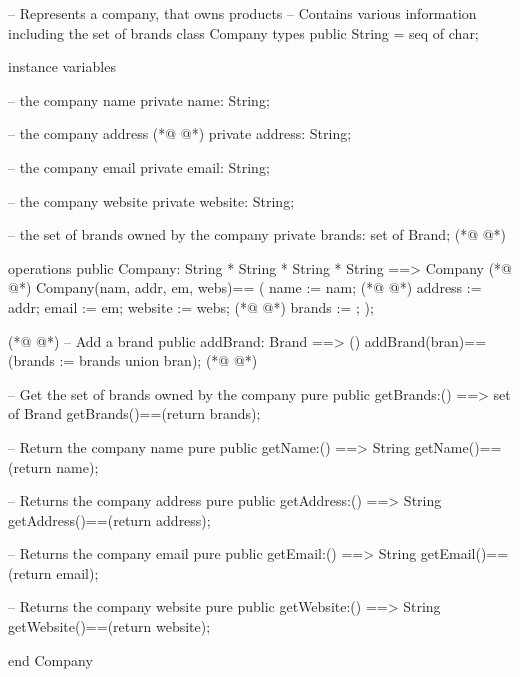 \begin{vdmpp}[breaklines=true]
-- Represents a company, that owns products
-- Contains various information including the set of brands
class Company
 types
  public String = seq of char;
 
 instance variables
 
   -- the company name
  private name: String;
  
  -- the company address
(*@
\label{Company:13}
@*)
  private address: String;
  
  -- the company email
  private email: String;
  
  -- the company website
  private website: String;
  
  -- the set of brands owned by the company
  private brands: set of Brand;
(*@
\label{addBrand:23}
@*)
  
 operations
  public Company: String * String * String * String ==> Company 
(*@
\label{getBrands:26}
@*)
  Company(nam, addr, em, webs)==
  (
   name := nam;
(*@
\label{getName:29}
@*)
   address := addr;
   email := em;
   website := webs;
(*@
\label{getAddress:32}
@*)
   brands := {};
  );
  
(*@
\label{getEmail:35}
@*)
  -- Add a brand
  public addBrand: Brand ==> ()
  addBrand(bran)==(brands := brands union {bran});
(*@
\label{getWebsite:38}
@*)
  
  -- Get the set of brands owned by the company
  pure public getBrands:() ==> set of Brand
  getBrands()==(return brands);

  -- Return the company name
  pure public getName:() ==> String
  getName()==(return name);
  
  -- Returns the company address
  pure public getAddress:() ==> String
  getAddress()==(return address);
  
  -- Returns the company email
  pure public getEmail:() ==> String
  getEmail()==(return email);
  
  -- Returns the company website
  pure public getWebsite:() ==> String
  getWebsite()==(return website);
  
end Company
\end{vdmpp}
